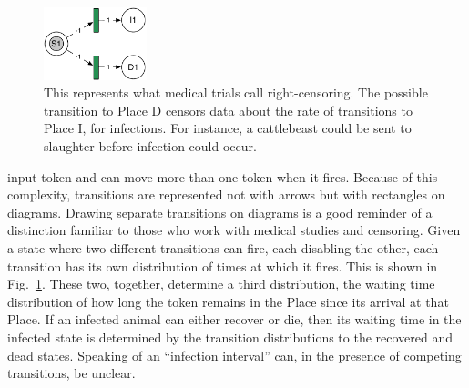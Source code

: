 \documentclass{article}
\begin{document}
\begin{figure}
\centerline{\includegraphics[width=3cm]{censor_gspn}}
\caption{This represents what medical trials call right-censoring.
The possible transition to Place D censors data about the rate
of transitions to Place I, for infections. For instance,
a cattlebeast could be sent to slaughter before infection
could occur.\label{fig:censorgspn}}
\end{figure}%
input token and can move more than one token when it fires.
Because of this complexity, transitions are represented not
with arrows but with rectangles on diagrams. Drawing separate
transitions on diagrams is a good reminder of a distinction
familiar to those who work with medical studies and censoring. Given
a state where two different transitions can fire, each
disabling the other, each transition has its own distribution
of times at which it fires. This is shown in
Fig.~\ref{fig:censorgspn}. These two, together, determine
a third distribution, the waiting time distribution of
how long the token remains in the Place since its arrival
at that Place. If an infected animal can either recover
or die, then its waiting time in the infected state is
determined by the transition distributions to the recovered
and dead states. Speaking of an ``infection interval'' can,
in the presence of competing transitions, be unclear.
\end{document}
